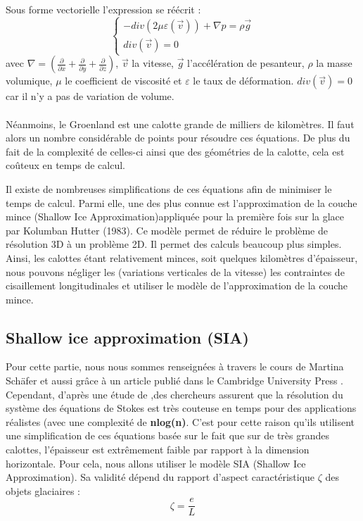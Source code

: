 \documentclass{article}
\begin{document}
Sous forme vectorielle l'expression se réécrit : 
\begin{equation}
\left\{
\begin{array}{l}
-div(2 \mu \varepsilon(\vec{v})) + \nabla p = \rho \vec{g} \\
div(\vec{v}) = 0 \qquad
\end{array}
\right.
\label{eq1}
\end{equation}
avec $\nabla = ( \frac{\partial}{\partial x} + \frac{\partial}{\partial y} + \frac{\partial}{\partial z})$, $\vec{v}$ la vitesse, $\vec{g}$ l'accélération de pesanteur, $\rho$ la masse volumique, $\mu$ le coefficient de viscosité et $\varepsilon$ le taux de déformation. $div(\vec{v}) = 0$ car il n'y a pas de variation de volume.
\\\\
Néanmoins, le Groenland est une calotte grande de milliers de kilomètres. Il faut alors un nombre considérable de points pour résoudre ces équations. De plus du fait de la complexité de celles-ci ainsi que des géométries de la calotte, cela est coûteux en temps de calcul. 


Il existe de nombreuses simplifications de  ces équations afin de minimiser le temps de calcul. Parmi elle, une des plus connue est l'approximation de la couche mince (Shallow Ice Approximation)appliquée pour la première fois sur la glace par Kolumban Hutter (1983). Ce modèle permet de réduire le problème de résolution 3D à un problème 2D. Il permet des calculs beaucoup plus simples. Ainsi, les calottes étant relativement minces, soit quelques kilomètres d'épaisseur, nous pouvons négliger les (variations verticales de la vitesse) les contraintes de cisaillement longitudinales et utiliser le modèle de l'approximation de la couche mince.

 \newpage
\subsection{Shallow ice approximation (SIA)}


Pour cette partie, nous nous sommes renseignées à travers le cours de Martina Schäfer \cite{schafer2007modelisation} et aussi grâce à un article publié dans le Cambridge University Press  \cite{seroussi_morlighem_rignot_khazendar_larour_mouginot_2013}.
\newline
Cependant, d'après une étude de ,des chercheurs assurent que la résolution du système des équations de Stokes est très couteuse en temps pour des applications réalistes (avec une complexité de \textbf{nlog(n)}. C'est pour cette raison qu'ils utilisent une simplification de ces équations basée sur le fait que sur de très grandes calottes, l'épaisseur est extrêmement faible par rapport à la dimension horizontale. Pour cela, nous allons utiliser le modèle SIA (Shallow Ice Approximation). Sa validité dépend du rapport d'aspect caractéristique $\zeta$ des objets glaciaires :
\begin{equation}
\zeta = \frac{e}{L}
\label{eq2} 
\end{equation}
\end{document}

